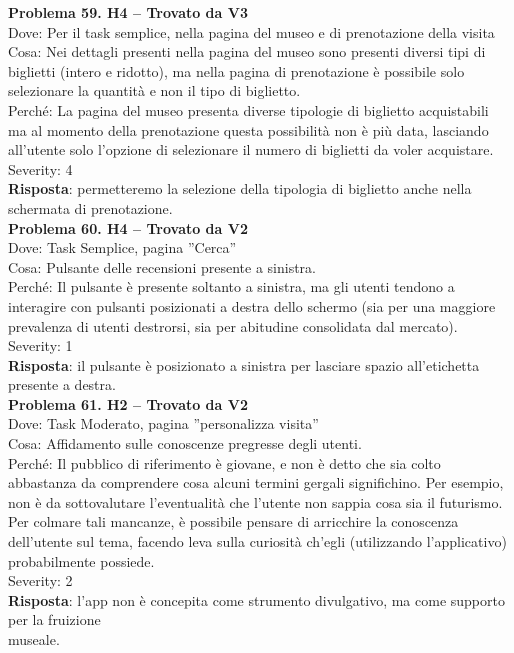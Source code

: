 \documentclass{article}
\begin{document}
\noindent \textbf{Problema 59. H4 – Trovato da V3} \\
Dove: Per il task semplice, nella pagina del museo e di prenotazione della visita \\
Cosa: Nei dettagli presenti nella pagina del museo sono presenti diversi tipi di biglietti (intero e ridotto), ma nella pagina di prenotazione è possibile solo selezionare la quantità e non il tipo di biglietto. \\
Perché: La pagina del museo presenta diverse tipologie di biglietto acquistabili ma al momento della prenotazione questa possibilità non è più data, lasciando all’utente solo l’opzione di selezionare il numero di biglietti da voler acquistare. \\
Severity: 4 \\
\textbf{Risposta}: permetteremo la selezione della tipologia di biglietto anche nella schermata di prenotazione.\\

\noindent \textbf{Problema 60. H4 – Trovato da V2} \\
Dove: Task Semplice, pagina ”Cerca” \\
Cosa: Pulsante delle recensioni presente a sinistra. \\
Perché: Il pulsante è presente soltanto a sinistra, ma gli utenti tendono a interagire con pulsanti posizionati a destra dello schermo (sia per una maggiore prevalenza di utenti destrorsi, sia per abitudine consolidata dal mercato). \\
Severity: 1 \\
\textbf{Risposta}: il pulsante è posizionato a sinistra per lasciare spazio all’etichetta presente a destra.\\

\noindent \textbf{Problema 61. H2 – Trovato da V2} \\
Dove: Task Moderato, pagina ”personalizza visita” \\
Cosa: Affidamento sulle conoscenze pregresse degli utenti. \\
Perché: Il pubblico di riferimento è giovane, e non è detto che sia colto abbastanza da comprendere cosa alcuni termini gergali significhino. Per esempio, non è da sottovalutare l’eventualità che l’utente non sappia cosa sia il futurismo. Per colmare tali mancanze, è possibile pensare di arricchire la conoscenza dell’utente sul tema, facendo leva sulla curiosità ch’egli (utilizzando l’applicativo) probabilmente possiede. \\
Severity: 2 \\
\textbf{Risposta}: l’app non è concepita come strumento divulgativo, ma come supporto per la fruizione \\ museale.
\\
\end{document}

